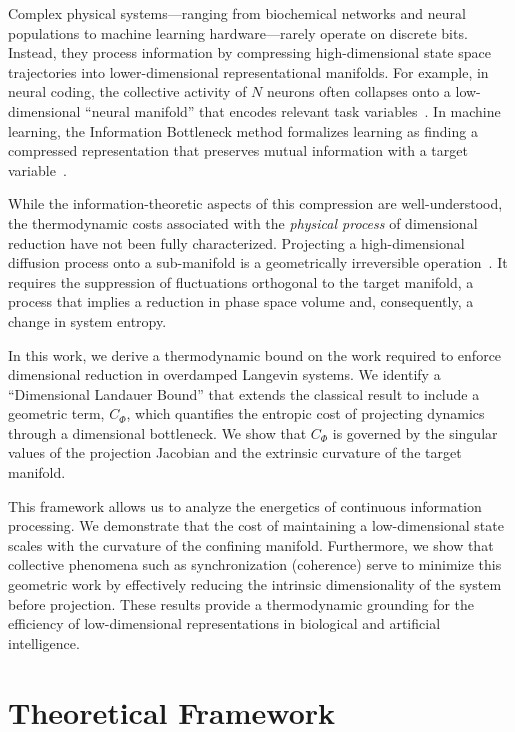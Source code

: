 \documentclass[aps,pre,twocolumn,superscriptaddress,floatfix]{revtex4-2}
\begin{document}
Complex physical systems---ranging from biochemical networks and neural populations to machine learning hardware---rarely operate on discrete bits. Instead, they process information by compressing high-dimensional state space trajectories into lower-dimensional representational manifolds. For example, in neural coding, the collective activity of $N$ neurons often collapses onto a low-dimensional ``neural manifold'' that encodes relevant task variables~\cite{cunningham2014,gallego2017}. In machine learning, the Information Bottleneck method formalizes learning as finding a compressed representation that preserves mutual information with a target variable~\cite{tishby2000}.

While the information-theoretic aspects of this compression are well-understood, the thermodynamic costs associated with the \emph{physical process} of dimensional reduction have not been fully characterized. Projecting a high-dimensional diffusion process onto a sub-manifold is a geometrically irreversible operation~\cite{cover2006}. It requires the suppression of fluctuations orthogonal to the target manifold, a process that implies a reduction in phase space volume and, consequently, a change in system entropy.

In this work, we derive a thermodynamic bound on the work required to enforce dimensional reduction in overdamped Langevin systems. We identify a ``Dimensional Landauer Bound'' that extends the classical result to include a geometric term, $C_\Phi$, which quantifies the entropic cost of projecting dynamics through a dimensional bottleneck. We show that $C_\Phi$ is governed by the singular values of the projection Jacobian and the extrinsic curvature of the target manifold.

This framework allows us to analyze the energetics of continuous information processing. We demonstrate that the cost of maintaining a low-dimensional state scales with the curvature of the confining manifold. Furthermore, we show that collective phenomena such as synchronization (coherence) serve to minimize this geometric work by effectively reducing the intrinsic dimensionality of the system before projection. These results provide a thermodynamic grounding for the efficiency of low-dimensional representations in biological and artificial intelligence.

\section{Theoretical Framework}
\end{document}

